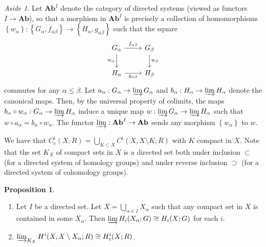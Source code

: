 \documentclass[10pt,letterpaper,cm]{nupset}
\theoremstyle{definition}
\theoremstyle{theorem}
\newtheorem{prop}[definition]{Proposition}
\theoremstyle{remark}
\newtheorem*{aside}{Aside}
\newcommand{\1}{\mathbb{1}}
\newcommand{\0}{\vec 0}
\begin{document}
\begin{aside}
Let $\mathbf{Ab}^I$ denote the category of directed systems (viewed as functors $I \to \mathbf{Ab}$), so that a morphism in $\mathbf{Ab}^I$ is precisely a collection of homomorphisms $\left\{w_{\alpha}\right\}: \left\{G_{\alpha}, f_{\alpha{\beta}}\right\} \to \left\{H_{\alpha}, g_{\alpha{\beta}}\right\}$ such that the square 
\[ \begin{tikzcd}
G_{\alpha} \arrow[d, "w_{\alpha}"'] \arrow[r, "f_{\alpha{\beta}}"] & G_{\beta} \arrow[d, "w_{\beta}"] \\
H_{\alpha} \arrow[r, "g_{\alpha{\beta}}"']                         & H_{\beta}                       
\end{tikzcd}
\] commutes for any $\alpha \leq \beta$. Let $a_{\alpha} : G_{\alpha} \to \varinjlim G_{\alpha}$ and $b_{\alpha} : H_{\alpha} \to \varinjlim H_{\alpha}$ denote the canonical maps. Then, by the universal property of colimits, the maps $b_{\alpha} \circ w_{\alpha} : G_{\alpha} \to  \varinjlim H_{\alpha}$ induce a unique map $w:  \varinjlim G_{\alpha} \to  \varinjlim H_{\alpha}$ such that $w \circ a_{\alpha} = b_{\alpha} \circ w_{\alpha}$.
The functor $\varinjlim : \mathbf{Ab}^I \to \mathbf{Ab}$ sends any morphism $\left\{w_{\alpha}\right\}$ to $w$.
\end{aside}

\smallskip

We have that $C_c^i(X; R) = \bigcup_{K \subset X} C^i(X, X \setminus K; R)$ with  $K$ compact in $X$. Note that the set $K_X$ of compact sets in $X$ is a directed set both under inclusion $\subset$ (for a directed system of homology groups) and under reverse inclusion $\supset$ (for a directed system of cohomology groups). 


\begin{prop}\label{prop25} $ $
\begin{enumerate} 
\item Let $I$ be a directed set. Let $X= \bigcup_{\alpha \in I}X_{\alpha}$ such that any compact set in $X$ is contained in some $X_{\alpha}$. Then $\varinjlim H_i(X_{\alpha}; G) \cong H_i(X; G)$ for each $i$.
\item $\varinjlim_{K_X} H^i(X, X \setminus X_{\alpha}; R) \cong H^i_c(X; R)$.
\end{enumerate}
\end{prop}

\smallskip
\end{document}
